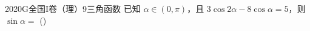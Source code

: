 
\begin{problem}{2020}{G}{全国I卷（理）}{9}{三角函数}
已知 $ \alpha \in (0, \pi) $，且 $ 3\cos 2\alpha - 8\cos \alpha = 5 $，则 $ \sin \alpha = $ (\hspace{1cm})
\begin{choices}
\end{choices}
\end{problem}

\begin{answer}

\end{answer}

\begin{solutions}

\end{solutions}